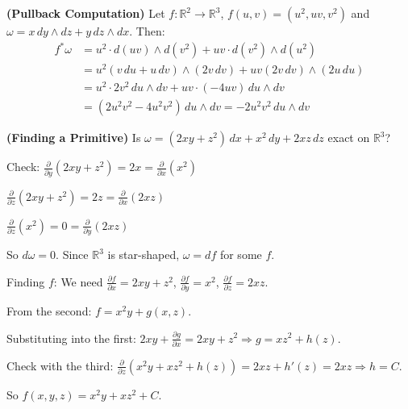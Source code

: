\documentclass[11pt, letterpaper, openany]{book}
\begin{document}
\begin{example}
\textbf{(Pullback Computation)}
Let $f: \mathbb{R}^2 \to \mathbb{R}^3$, $f(u,v) = (u^2, uv, v^2)$ and $\omega = x\,dy \wedge dz + y\,dz \wedge dx$. Then:
\begin{align*}
f^*\omega &= u^2 \cdot d(uv) \wedge d(v^2) + uv \cdot d(v^2) \wedge d(u^2) \\
&= u^2 (v\,du + u\,dv) \wedge (2v\,dv) + uv(2v\,dv) \wedge (2u\,du) \\
&= u^2 \cdot 2v^2\,du \wedge dv + uv \cdot (-4uv)\,du \wedge dv \\
&= (2u^2v^2 - 4u^2v^2)\,du \wedge dv = -2u^2v^2\,du \wedge dv
\end{align*}
\end{example}

\begin{example}
\textbf{(Finding a Primitive)}
Is $\omega = (2xy + z^2)\,dx + x^2\,dy + 2xz\,dz$ exact on $\mathbb{R}^3$?

Check: $\frac{\partial}{\partial y}(2xy + z^2) = 2x = \frac{\partial}{\partial x}(x^2)$ \checkmark

$\frac{\partial}{\partial z}(2xy + z^2) = 2z = \frac{\partial}{\partial x}(2xz)$ \checkmark

$\frac{\partial}{\partial z}(x^2) = 0 = \frac{\partial}{\partial y}(2xz)$ \checkmark

So $d\omega = 0$. Since $\mathbb{R}^3$ is star-shaped, $\omega = df$ for some $f$.

Finding $f$: We need $\frac{\partial f}{\partial x} = 2xy + z^2$, $\frac{\partial f}{\partial y} = x^2$, $\frac{\partial f}{\partial z} = 2xz$.

From the second: $f = x^2 y + g(x,z)$.

Substituting into the first: $2xy + \frac{\partial g}{\partial x} = 2xy + z^2 \Rightarrow g = xz^2 + h(z)$.

Check with the third: $\frac{\partial}{\partial z}(x^2 y + xz^2 + h(z)) = 2xz + h'(z) = 2xz \Rightarrow h = C$.

So $f(x,y,z) = x^2 y + xz^2 + C$.
\end{example}
\end{document}
